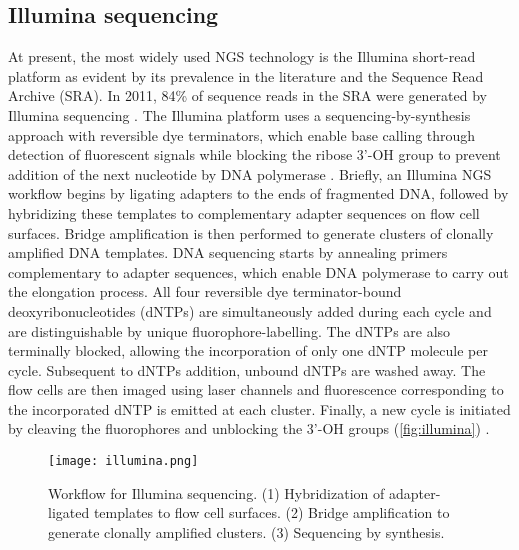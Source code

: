 
\subsection{Illumina sequencing}

At present, the most widely used NGS technology is the Illumina short-read platform as evident by its prevalence in the literature and the Sequence Read Archive (\acs{SRA}). In 2011, 84\% of sequence reads in the SRA were generated by Illumina sequencing \cite{Kodama2012}. The Illumina platform uses a sequencing-by-synthesis approach with reversible dye terminators, which enable base calling through detection of fluorescent signals while blocking the ribose 3'-OH group to prevent addition of the next nucleotide by DNA polymerase \cite{Bentley2008, Guo2008}. Briefly, an Illumina NGS workflow begins by ligating adapters to the ends of fragmented DNA, followed by hybridizing these templates to complementary adapter sequences on flow cell surfaces. Bridge amplification is then performed to generate clusters of clonally amplified DNA templates. DNA sequencing starts by annealing primers complementary to adapter sequences, which enable DNA polymerase to carry out the elongation process. All four reversible dye terminator-bound deoxyribonucleotides (\acs{dNTP}s) are simultaneously added during each cycle and are distinguishable by unique fluorophore-labelling. The dNTPs are also terminally blocked, allowing the incorporation of only one dNTP molecule per cycle. Subsequent to dNTPs addition, unbound dNTPs are washed away. The flow cells are then imaged using laser channels and fluorescence corresponding to the incorporated dNTP is emitted at each cluster. Finally, a new cycle is initiated by cleaving the fluorophores and unblocking the 3'-OH groups (\autoref{fig:illumina}) \cite{Mardis2013, Goodwin2016, Levy2016, Mardis2017}.


\newpage
\begin{landscape}

\begin{figure}[H]
	\centering
	\texttt{[image: illumina.png]}
	\caption[Workflow for Illumina sequencing.]{Workflow for Illumina sequencing. (1) Hybridization of adapter-ligated templates to flow cell surfaces. (2) Bridge amplification to generate clonally amplified clusters. (3) Sequencing by synthesis.}
	\label{fig:illumina}
\end{figure}

\end{landscape}

